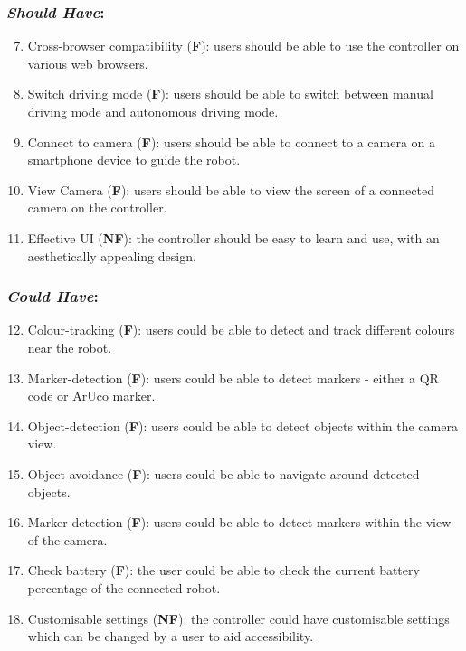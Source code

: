 \documentclass{l4proj}
\begin{document}
\subsubsection{\textit{Should Have}:}
\begin{enumerate}[label=B.\arabic*]
\setcounter{enumi}{6}
    \item Cross-browser compatibility (\textbf{F}): users should be able to use the controller on various web browsers.
    \item Switch driving mode (\textbf{F}): users should be able to switch between manual driving mode and autonomous driving mode.
    \item Connect to camera (\textbf{F}): users should be able to connect to a camera on a smartphone device to guide the robot.
    \item View Camera (\textbf{F}): users should be able to view the screen of a connected camera on the controller.
    \item Effective UI (\textbf{NF}): the controller should be easy to learn and use, with an aesthetically appealing design.
\end{enumerate}

\subsubsection{\textit{Could Have}:}
\begin{enumerate}[label=B.\arabic*]
\setcounter{enumi}{11}
    \item Colour-tracking (\textbf{F}): users could be able to detect and track different colours near the robot.
    \item Marker-detection (\textbf{F}): users could be able to detect markers - either a QR code or ArUco marker. 
    \item Object-detection (\textbf{F}): users could be able to detect objects within the camera view.
    \item Object-avoidance (\textbf{F}): users could be able to navigate around detected objects.
    \item Marker-detection (\textbf{F}): users could be able to detect markers within the view of the camera.
    \item Check battery (\textbf{F}): the user could be able to check the current battery percentage of the connected robot.
    \item Customisable settings (\textbf{NF}): the controller could have customisable settings which can be changed by a user to aid accessibility.
\end{enumerate}
\end{document}
